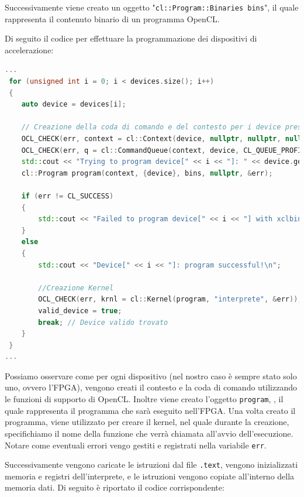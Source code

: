 Successivamente viene creato un oggetto "\texttt{cl::Program::Binaries bins}", il quale rappresenta il contenuto binario di un programma OpenCL.

Di seguito il codice per effettuare la programmazione dei dispositivi di accelerazione:
\begin{lstlisting}[language=C++,caption={ricerca dispositi},label={lst:ricerca}]
...
 for (unsigned int i = 0; i < devices.size(); i++)
 {
    auto device = devices[i];   
    
    // Creazione della coda di comando e del contesto per i device presenti
    OCL_CHECK(err, context = cl::Context(device, nullptr, nullptr, nullptr, &err));
    OCL_CHECK(err, q = cl::CommandQueue(context, device, CL_QUEUE_PROFILING_ENABLE, &err)); 
    std::cout << "Trying to program device[" << i << "]: " << device.getInfo<CL_DEVICE_NAME>() << std::endl;
    cl::Program program(context, {device}, bins, nullptr, &err);    
    
    if (err != CL_SUCCESS)
    {
        std::cout << "Failed to program device[" << i << "] with xclbin file!\n";
    }
    else
    {
        std::cout << "Device[" << i << "]: program successful!\n"; 
        
        //Creazione Kernel
        OCL_CHECK(err, krnl = cl::Kernel(program, "interprete", &err)); 
        valid_device = true;
        break; // Device valido trovato
    }
 }
...
\end{lstlisting}
Possiamo osservare come per ogni dispositivo (nel nostro caso è sempre stato solo uno, ovvero l'FPGA), vengono creati il contesto e la coda di comando utilizzando le funzioni di supporto di OpenCL. Inoltre viene creato l'oggetto \texttt{program}, , il quale rappresenta il programma che sarà eseguito nell'FPGA. Una volta creato il programma, viene utilizzato per creare il kernel, nel quale durante la creazione, specifichiamo il nome della funzione che verrà chiamata all'avvio dell'esecuzione.
Notare come eventuali errori vengo gestiti e registrati nella variabile \texttt{err}.

Successivamente vengono caricate le istruzioni dal file \texttt{.text}, vengono inizializzati memoria e registri dell'interprete, e le istruzioni vengono copiate all'interno della memoria dati. Di seguito è riportato il codice corrispondente: 

